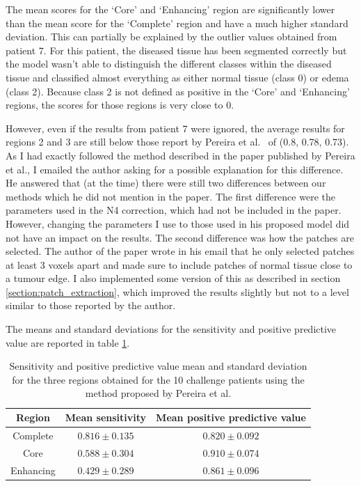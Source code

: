 \documentclass[12pt,a4paper,twoside,openright]{report}
\begin{document}
The mean scores for the `Core' and `Enhancing' region are significantly lower than the mean score for the `Complete' region and have a much higher standard deviation. This can partially be explained by the outlier values obtained from patient 7. For this patient, the diseased tissue has been segmented correctly but the model wasn't able to distinguish the different classes within the diseased tissue and classified almost everything as either normal tissue (class 0) or edema (class 2). Because class 2 is not defined as positive in the `Core' and `Enhancing' regions, the scores for those regions is very close to 0.  

However, even if the results from patient 7 were ignored, the average results for regions 2 and 3 are still below those report by Pereira et al.\ \cite{pereira} of (0.8, 0.78, 0.73). As I had exactly followed the method described in the paper published by Pereira et al., I emailed the author asking for a possible explanation for this difference. He answered that (at the time) there were still two differences between our methods which he did not mention in the paper. The first difference were the parameters used in the N4 correction, which had not be included in the paper. However, changing the parameters I use to those used in his proposed model did not have an impact on the results. The second difference was how the patches are selected. The author of the paper wrote in his email that he only selected patches at least 3 voxels apart and made sure to include patches of normal tissue close to a tumour edge. I also implemented some version of this as described in section \ref{section:patch_extraction}, which improved the results slightly but not to a level similar to those reported by the author.

The means and standard deviations for the sensitivity and positive predictive value are reported in table \ref{table:pereira_sensitivity_average}.

\begin{table}
\centering	
\label{table:pereira_sensitivity_average}
\begin{tabular}{ c | c | c} 
\textbf{Region} & \textbf{Mean sensitivity } & \textbf{Mean positive predictive value} \\
\hline
Complete &	$0.816 \pm 0.135$ & $0.820 \pm 0.092$ \\
Core & 		$0.588 \pm 0.304$ & $0.910 \pm 0.074$ \\
Enhancing & $0.429 \pm 0.289$ & $0.861 \pm 0.096$\\
\end{tabular}
\caption{Sensitivity and positive predictive value mean and standard deviation for the three regions obtained for the 10 challenge patients using the method proposed by Pereira et al.}
\end{table}
\end{document}

